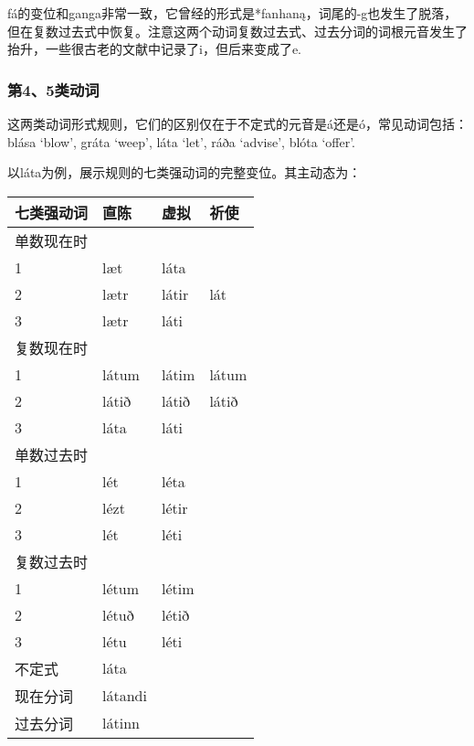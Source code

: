 fá的变位和ganga非常一致，它曾经的形式是*fanhaną，词尾的-g也发生了脱落，但在复数过去式中恢复。注意这两个动词复数过去式、过去分词的词根元音发生了抬升，一些很古老的文献中记录了i，但后来变成了e.

\subsubsection{第4、5类动词}

这两类动词形式规则，它们的区别仅在于不定式的元音是á还是ó，常见动词包括：blása `blow', gráta `weep', láta `let', ráða `advise', blóta `offer‌'.

以láta为例，展示规则的七类强动词的完整变位。其主动态为：

\begin{longtable}{llll}
    \toprule
    七类强动词 & 直陈    & 虚拟  & 祈使  \\
    \midrule
    \endhead
    \bottomrule
    \endfoot
    单数现在时 &         &       &       \\
    1          & læt     & láta  &       \\
    2          & lætr    & látir & lát   \\
    3          & lætr    & láti  &       \\
    复数现在时 &         &       &       \\
    1          & látum   & látim & látum \\
    2          & látið   & látið & látið \\
    3          & láta    & láti  &       \\
    单数过去时 &         &       &       \\
    1          & lét     & léta  &       \\
    2          & lézt    & létir &       \\
    3          & lét     & léti  &       \\
    复数过去时 &         &       &       \\
    1          & létum   & létim &       \\
    2          & létuð   & létið &       \\
    3          & létu    & léti  &       \\
    不定式     & láta    &       &       \\
    现在分词   & látandi &       &       \\
    过去分词   & látinn  &       &       \\
\end{longtable}

